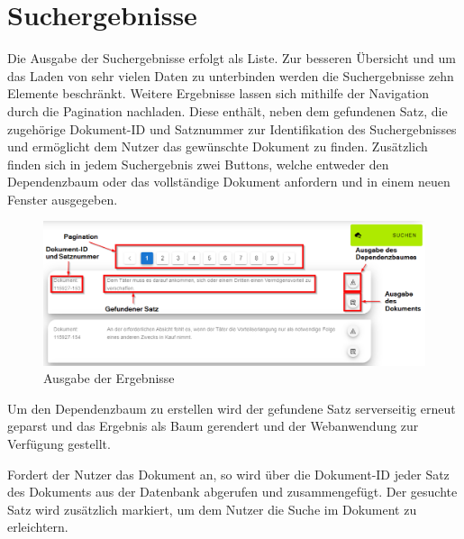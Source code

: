 \section{Suchergebnisse}

Die Ausgabe der Suchergebnisse erfolgt als Liste. Zur besseren Übersicht und um das Laden von sehr vielen Daten zu unterbinden werden die Suchergebnisse zehn Elemente beschränkt. Weitere Ergebnisse lassen sich mithilfe der Navigation durch die Pagination nachladen. Diese enthält, neben dem gefundenen Satz, die zugehörige Dokument-ID und Satznummer zur Identifikation des Suchergebnisses und ermöglicht dem Nutzer das gewünschte Dokument zu finden. Zusätzlich finden sich in jedem Suchergebnis zwei Buttons, welche entweder den Dependenzbaum oder das vollständige Dokument anfordern und in einem neuen Fenster ausgegeben.

\begin{figure}[H]
 \centering
 \includegraphics[width=\textwidth]{images/ResultScreenshot.png}
 \caption{Ausgabe der Ergebnisse}
 \label{fig:ResultScreenshot}
\end{figure}


Um den Dependenzbaum zu erstellen wird der gefundene Satz serverseitig erneut geparst und das Ergebnis als Baum gerendert und der Webanwendung zur Verfügung gestellt.

Fordert der Nutzer das Dokument an, so wird über die Dokument-ID jeder Satz des Dokuments aus der Datenbank abgerufen und zusammengefügt. Der gesuchte Satz wird zusätzlich markiert, um dem Nutzer die Suche im Dokument zu erleichtern.